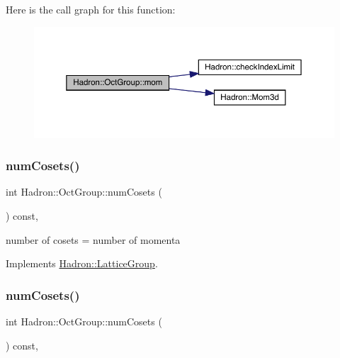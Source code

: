 Here is the call graph for this function\+:
\nopagebreak
\begin{figure}[H]
\begin{center}
\leavevmode
\includegraphics[width=350pt]{d1/de5/structHadron_1_1OctGroup_ab3c3d81d578cac614b1ccdd456f8ea59_cgraph}
\end{center}
\end{figure}
\mbox{\label{structHadron_1_1OctGroup_a85ea73ed466c052783d454b14d5b30bc}} 
\subsubsection{\texorpdfstring{numCosets()}{numCosets()}\hspace{0.1cm}{\footnotesize\ttfamily [1/3]}}
{\footnotesize\ttfamily int Hadron\+::\+Oct\+Group\+::num\+Cosets (\begin{DoxyParamCaption}{ }\end{DoxyParamCaption}) const\hspace{0.3cm}{\ttfamily [inline]}, {\ttfamily [virtual]}}

number of cosets = number of momenta 

Implements \mbox{\hyperlink{structHadron_1_1LatticeGroup_afc76430f36a3a041f86d4058c59bf55e}{Hadron\+::\+Lattice\+Group}}.

\mbox{\label{structHadron_1_1OctGroup_a85ea73ed466c052783d454b14d5b30bc}} 
\subsubsection{\texorpdfstring{numCosets()}{numCosets()}\hspace{0.1cm}{\footnotesize\ttfamily [2/3]}}
{\footnotesize\ttfamily int Hadron\+::\+Oct\+Group\+::num\+Cosets (\begin{DoxyParamCaption}{ }\end{DoxyParamCaption}) const\hspace{0.3cm}{\ttfamily [inline]}, {\ttfamily [virtual]}}

